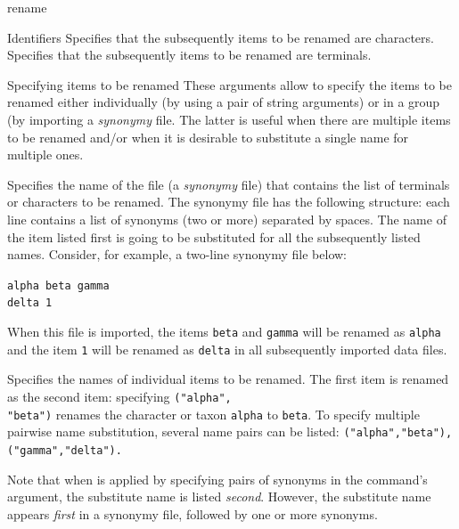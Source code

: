 \begin{command}{rename}{}
\begin{arguments}
\begin{argumentgroup}{Identifiers}
            {Specifies that the subsequently items to be renamed are characters.} 
            {}
            {Specifies that the subsequently items to be renamed are terminals.} 
            {}
	\end{argumentgroup}
	      
	      \begin{argumentgroup}{Specifying items to be renamed}
	      {These arguments allow to specify the items to be renamed either individually (by 
	      using a pair of string arguments) or in a group (by importing a \emph{synonymy} file.
	      The latter is useful when there are multiple items to be renamed and/or when it is
	      desirable to substitute a single name for  multiple ones.}
	      
                {Specifies the name of the file (a \emph{synonymy} file) that contains the list of
                terminals or characters to be renamed. The synonymy file has the following structure:
                each line contains a list of synonyms (two or more) separated by spaces. The name of the
                item listed first is going to be substituted for all the subsequently listed names. Consider,
                for example, a two-line synonymy file below:
                
                \texttt{alpha beta gamma \\
                delta 1\\}
                 
                 When this file is imported, the items \texttt{beta} and \texttt{gamma} will be
                 renamed as \texttt{alpha} and the item \texttt{1} will be renamed as \texttt{delta}
                 in all subsequently imported data files.}
                {}
                {Specifies the names of individual items to be renamed. The first item is renamed
                as the second item: specifying \texttt{("alpha",\\"beta")} renames the character or taxon
                \texttt{alpha} to \texttt{beta}. To specify multiple pairwise name substitution, several 
                name pairs can be listed: \texttt{("alpha","beta"),("gamma","delta").}}
                {}
                
                \begin{statement}
                Note that when  is applied by specifying pairs of
                 synonyms in the command's argument,
                the substitute name is listed \emph{second}. However,  the substitute name 
                appears \emph{first} in a synonymy file, followed by one or more synonyms.
                \end{statement}
	      \end{argumentgroup}
	      

\end{arguments}
\end{command}
